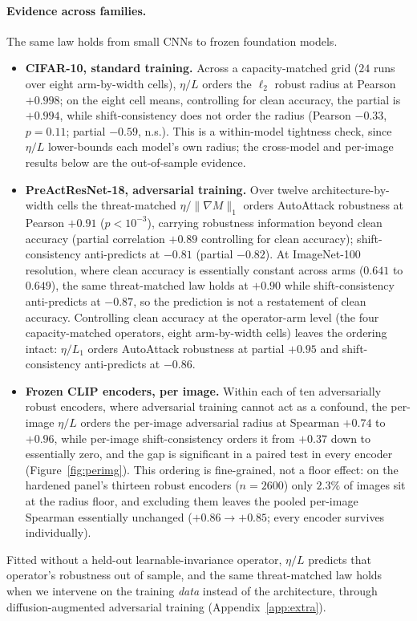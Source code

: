 \documentclass{article}
\theoremstyle{definition}
\newcommand{\etaL}{\eta/L}
\newcommand{\grad}{\nabla}
\begin{document}
\paragraph{Evidence across families.}
The same law holds from small CNNs to frozen foundation models.
\begin{itemize}[leftmargin=1.2em,itemsep=2pt]
\item \textbf{CIFAR-10, standard training.} Across a capacity-matched grid ($24$ runs over eight
arm-by-width cells), $\etaL$ orders the $\ell_2$ robust radius at Pearson $+0.998$; on the eight cell
means, controlling for clean accuracy, the partial is $+0.994$, while shift-consistency does not order
the radius (Pearson $-0.33$, $p=0.11$; partial $-0.59$, n.s.). This is a within-model tightness check,
since $\etaL$ lower-bounds each model's own radius; the cross-model and per-image results below are the
out-of-sample evidence.
\item \textbf{PreActResNet-18, adversarial training.} Over twelve architecture-by-width cells the
threat-matched $\eta/\lVert\grad M\rVert_1$ orders AutoAttack robustness at Pearson $+0.91$
($p<10^{-3}$), carrying robustness information beyond clean accuracy (partial correlation $+0.89$
controlling for clean accuracy); shift-consistency anti-predicts at $-0.81$ (partial $-0.82$). At
ImageNet-100 resolution, where clean accuracy is essentially constant across arms ($0.641$ to $0.649$),
the same threat-matched law holds at $+0.90$ while shift-consistency anti-predicts at $-0.87$, so the
prediction is not a restatement of clean accuracy. Controlling clean accuracy at the operator-arm level
(the four capacity-matched operators, eight arm-by-width cells) leaves the ordering intact: $\eta/L_1$
orders AutoAttack robustness at partial $+0.95$ and shift-consistency anti-predicts at $-0.86$.
\item \textbf{Frozen CLIP encoders, per image.} Within each of ten adversarially robust encoders, where
adversarial training cannot act as a confound, the per-image $\etaL$ orders the per-image adversarial
radius at Spearman $+0.74$ to $+0.96$, while per-image shift-consistency orders it from $+0.37$ down to
essentially zero, and the gap is significant in a paired test in every encoder (Figure~\ref{fig:perimg}).
This ordering is fine-grained, not a floor effect: on the hardened panel's thirteen robust encoders
($n{=}2600$) only $2.3\%$ of images sit at the radius floor, and excluding them leaves the pooled
per-image Spearman essentially unchanged ($+0.86\to+0.85$; every encoder survives individually).
\end{itemize}
Fitted without a held-out learnable-invariance operator, $\etaL$ predicts that operator's robustness out
of sample, and the same threat-matched law holds when we intervene on the training \emph{data} instead
of the architecture, through diffusion-augmented adversarial training (Appendix~\ref{app:extra}).
\end{document}
